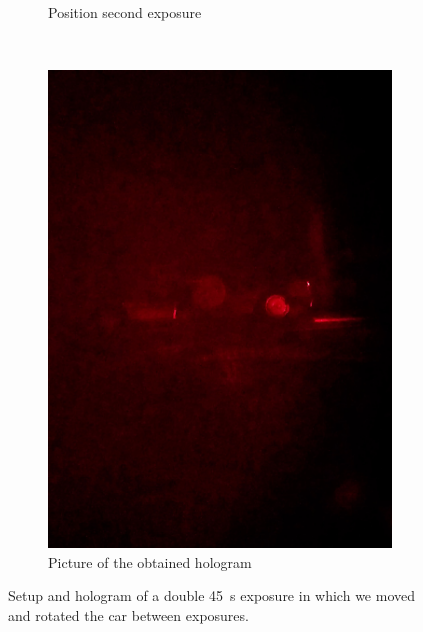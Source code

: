 \documentclass[11pt,a4paper]{article}
\begin{document}
\begin{figure}[ht]
\begin{subfigure}[b]{0.45\textwidth}
\caption{Position second exposure}
\label{fig:dir2}
\end{subfigure}\\\vspace{.2cm}
\begin{subfigure}[b]{0.45\textwidth}
\includegraphics[width=\textwidth]{car_double_exposure_hologram}
\caption{Picture of the obtained hologram}
\label{fig:result}
\end{subfigure}
\caption{Setup and hologram of a double \SI{45}{\second} exposure in which we moved and rotated the car between exposures.}
\label{fig:experiment_double_exposure}
\end{figure}


\newpage
\nocite{*}


\end{document}
